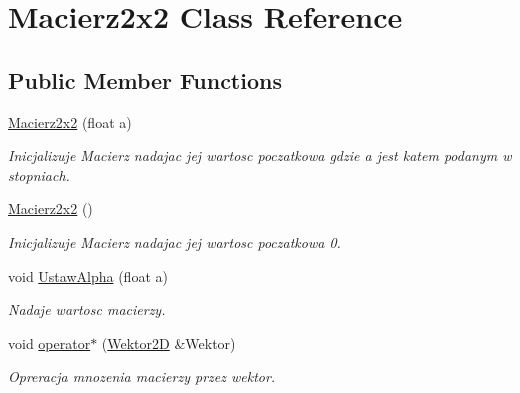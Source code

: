 \hypertarget{class_macierz2x2}{\section{Macierz2x2 Class Reference}
\label{class_macierz2x2}
}
\subsection*{Public Member Functions}
\begin{DoxyCompactItemize}
\item 
\hypertarget{class_macierz2x2_a861f1d0e78cf346396bc30ac3af28fce}{\hyperlink{class_macierz2x2_a861f1d0e78cf346396bc30ac3af28fce}{Macierz2x2} (float a)}\label{class_macierz2x2_a861f1d0e78cf346396bc30ac3af28fce}

\begin{DoxyCompactList}\small\item\em Inicjalizuje Macierz nadajac jej wartosc poczatkowa gdzie a jest katem podanym w stopniach. \end{DoxyCompactList}\item 
\hypertarget{class_macierz2x2_acbcea1b811870ddce0e439b2837a1a49}{\hyperlink{class_macierz2x2_acbcea1b811870ddce0e439b2837a1a49}{Macierz2x2} ()}\label{class_macierz2x2_acbcea1b811870ddce0e439b2837a1a49}

\begin{DoxyCompactList}\small\item\em Inicjalizuje Macierz nadajac jej wartosc poczatkowa 0. \end{DoxyCompactList}\item 
void \hyperlink{class_macierz2x2_a78dcdc542f77a97fcac7ab017ef39f7d}{Ustaw\+Alpha} (float a)
\begin{DoxyCompactList}\small\item\em Nadaje wartosc macierzy. \end{DoxyCompactList}\item 
\hypertarget{class_macierz2x2_a20d1f89bcafd4634cd0f93efaa40a60d}{void \hyperlink{class_macierz2x2_a20d1f89bcafd4634cd0f93efaa40a60d}{operator$\ast$} (\hyperlink{class_wektor2_d}{Wektor2\+D} \&Wektor)}\label{class_macierz2x2_a20d1f89bcafd4634cd0f93efaa40a60d}

\begin{DoxyCompactList}\small\item\em Opreracja mnozenia macierzy przez wektor. \end{DoxyCompactList}\end{DoxyCompactItemize}



